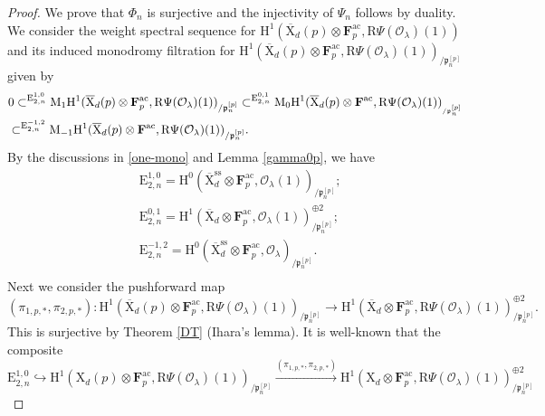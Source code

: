 \documentclass[10pt]{amsart}
\numberwithin{equation}{section}
\theoremstyle{plain}
\numberwithin{equation}{section}
\theoremstyle{definition}
\theoremstyle{remark}
\def\ac{\mathrm{ac}}
\def\ss{\mathrm{ss}}
\def\ac{\mathrm{ac}}
\def\calO{\mathcal{O}}
\def\frakp{\mathfrak{p}}
\def\FF{\mathbf{F}}
\def\rmH{\mathrm{H}}
\def\rmE{\mathrm{E}}
\def\rmM{\mathrm{M}}
\def\rmX{\mathrm{X}}
\def\rmXbar{\overline{\rmX}}
\def\rmR{\mathrm{R}}
\begin{document}
\begin{proof}
We prove that $\Phi_{n}$ is surjective and the injectivity of $\Psi_{n}$ follows by duality. We consider the weight spectral sequence for $\rmH^{1}(\rmXbar_{d}(p)\otimes{\FF^{\ac}_{p}}, \rmR\Psi(\calO_{\lambda})(1))$ and its induced monodromy filtration for $\rmH^{1}(\rmXbar_{d}(p)\otimes{\FF^{\ac}_{p}}, \rmR\Psi(\calO_{\lambda})(1))_{/\frakp^{[p]}_{n}}$ given by
\begin{equation}\relax
\begin{aligned}
&0\subset^{\rmE^{1,0}_{2,n}} \rmM_{1}\rmH^{1}(\rmXbar_{d}(p)\otimes{\FF^{\ac}_{p}},\rmR\Psi(\calO_{\lambda})(1))_{/\frakp^{[p]}_{n}}\subset^{\rmE^{0,1}_{2,n}} \rmM_{0}\rmH^{1}(\rmXbar_{d}(p)\otimes{\FF^{\ac}}, \rmR\Psi(\calO_{\lambda})(1))_{_{/\frakp^{[p]}_{n}}}\\
&\subset^{\rmE^{-1,2}_{2, n}} \rmM_{-1}\rmH^{1}(\rmXbar_{d}(p)\otimes{\FF^{\ac}}, \rmR\Psi(\calO_{\lambda})(1))_{/\frakp^{[p]}_{n}}.\\
\end{aligned}
\end{equation}
By the discussions in \ref{one-mono} and Lemma \ref{gamma0p},  we have 
\begin{equation*}
\begin{aligned}
&\rmE^{1,0}_{2,n}= \rmH^{0}(\overline{\rmX}^{\ss}_{d}\otimes{\FF^{\ac}_{p}}, \calO_{\lambda}(1))_{/\frakp^{[p]}_{n}};\\
&\rmE^{0,1}_{2, n}=\rmH^{1}(\overline{\rmX}_{d}\otimes {\FF^{\ac}_{p}},\calO_{\lambda}(1))^{\oplus 2}_{/\frakp^{[p]}_{n}};\\
&\rmE^{-1,2}_{2, n}=\rmH^{0}(\overline{\rmX}^{\ss}_{d}\otimes {\FF^{\ac}_{p}}, \calO_{\lambda})_{/\frakp^{[p]}_{n}}.\\
\end{aligned}
\end{equation*}
Next we consider the pushforward map 
\begin{equation*}
(\pi_{1,p,*}, \pi_{2,p,*}): \rmH^{1}(\rmXbar_{d}(p)\otimes{\FF^{\ac}_{p}}, \rmR\Psi(\calO_{\lambda})(1))_{/\frakp^{[p]}_{n}}\rightarrow \rmH^{1}(\rmXbar_{d}\otimes{\FF^{\ac}_{p}}, \rmR\Psi(\calO_{\lambda})(1))_{/\frakp^{[p]}_{n}}^{\oplus 2}.
\end{equation*}
This is surjective by Theorem \ref{DT} (Ihara's lemma). It is well-known that the composite 
\begin{equation*}
\rmE^{1,0}_{2,n}\hookrightarrow \rmH^{1}(\rmX_{d}(p)\otimes{\FF^{\ac}_{p}}, \rmR\Psi(\calO_{\lambda})(1))_{/\frakp^{[p]}_{n}}\xrightarrow{(\pi_{1,p,*}, \pi_{2,p,*})} \rmH^{1}(\rmX_{d}\otimes{\FF^{\ac}_{p}}, \rmR\Psi(\calO_{\lambda})(1))^{\oplus 2}_{/\frakp^{[p]}_{n}}

\end{equation*}
\end{proof}
\end{document}

